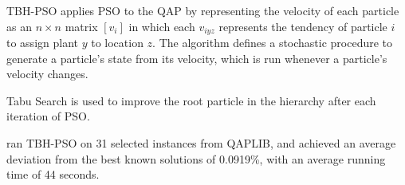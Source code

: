 {	TBH-PSO applies PSO to the QAP by representing the velocity of each particle as an \(n \times n\) matrix \([v_{i}]\) in which each \(v_{iyz}\) represents the tendency of particle \(i\) to assign plant \(y\) to location \(z\).
	The algorithm defines a stochastic procedure to generate a particle's state from its velocity, which is run whenever a particle's velocity changes.

	Tabu Search is used to improve the root particle in the hierarchy after each iteration of PSO.

	\citeauthor{Helal:2015de} ran TBH-PSO on 31 selected instances from QAPLIB, and achieved an average deviation from the best known solutions of 0.0919\%, with an average running time of 44 seconds.
}
